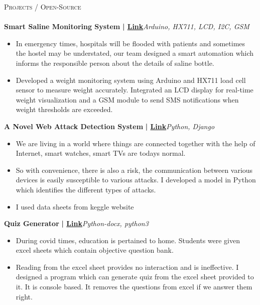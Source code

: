 \documentclass[a4paper]{article}
\newcommand{\lineunder} {
    \vspace*{-8pt} \\
    \hspace*{-18pt} \hrulefill \\
}
\newcommand{\header} [1] {
    {\hspace*{-18pt}\vspace*{6pt} \textsc{#1}}
    \vspace*{-6pt} \lineunder
}
\begin{document}
      \header{Projects / Open-Source}
      \vspace{2mm}
      {\textbf{Smart Saline Monitoring System}}\textbf{ | \href{https://github.com/KOAwesome/Smart-Saline-Monitoring-System}{Link}}\hfill{\sl Arduino, HX711, LCD, I2C, GSM}\\
          \vspace{-3mm}
\begin{itemize} \itemsep -3pt
\item  In emergency times, hospitals will be flooded with patients and sometimes the hostel may be understated, our team designed a smart automation which informs the responsible person about the details of saline bottle.
\item  Developed a weight monitoring system using Arduino and HX711 load cell sensor to measure weight accurately. Integrated an LCD display for real-time weight visualization and a GSM module to send SMS notifications when weight thresholds are exceeded.
\end{itemize}
          \vspace*{3mm}
      {\textbf{A Novel Web Attack Detection System}}\textbf{ | \href{https://github.com/KOAwesome/A-Novel-Web-Attack-Detection-System}{Link}}\hfill{\sl Python, Django}\\
          \vspace{-3mm}
\begin{itemize} \itemsep -3pt
\item  We are living in a world where things are connected together with the help of Internet, smart watches, smart TVs are today\textquotesingle{}s normal.
\item  So with convenience, there is also a risk, the communication between various devices is easily susceptible to various attacks. I developed a model in Python which identifies the different types of attacks.
\item  I used data sheets from keggle website
\end{itemize}
          \vspace*{3mm}
      {\textbf{Quiz Generator}}\textbf{ | \href{https://github.com/KOAwesome/Quiz-Generator}{Link}}\hfill{\sl Python-docx, python3}\\
          \vspace{-3mm}
\begin{itemize} \itemsep -3pt
\item  During covid times, education is pertained to home. Students were given excel sheets which contain objective question bank.
\item  Reading from the excel sheet provides no interaction and is ineffective. I designed a program which can generate quiz from the excel sheet provided to it. It is console based. It removes the questions from excel if we answer them right.
\end{itemize}
          \vspace*{3mm}
\end{document}
